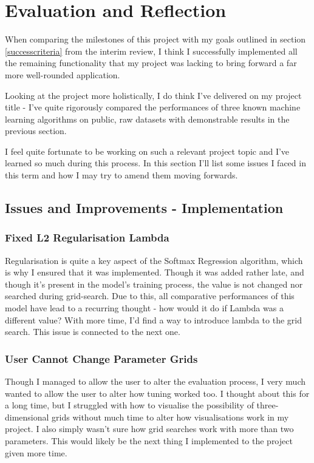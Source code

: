\documentclass[letterpaper,10pt]{article}
\begin{document}
\newpage
\section{Evaluation and Reflection}
When comparing the milestones of this project with my goals outlined in section \ref{successcriteria} from the interim review, I think I successfully implemented all the remaining functionality that my project was lacking to bring forward a far more well-rounded application. \par
Looking at the project more holistically, I do think I've delivered on my project title - I've quite rigorously compared the performances of three known machine learning algorithms on public, raw datasets with demonstrable results in the previous section. \par
I feel quite fortunate to be working on such a relevant project topic and I've learned so much during this process. In this section I'll list some issues I faced in this term and how I may try to amend them moving forwards.\par



\subsection{Issues and Improvements - Implementation}

\subsubsection{Fixed L2 Regularisation Lambda}
Regularisation is quite a key aspect of the Softmax Regression algorithm, which is why I ensured that it was implemented. Though it was added rather late, and though it's present in the model's training process, the value is not changed nor searched during grid-search. Due to this, all comparative performances of this model have lead to a recurring thought - how would it do if Lambda was a different value? With more time, I'd find a way to introduce lambda to the grid search. This issue is connected to the next one. \par

\subsubsection{User Cannot Change Parameter Grids}
Though I managed to allow the user to alter the evaluation process, I very much wanted to allow the user to alter how tuning worked too. I thought about this for a long time, but I struggled with how to visualise the possibility of three-dimensional grids without much time to alter how visualisations work in my project. I also simply wasn't sure how grid searches work with more than two parameters. This would likely be the next thing I implemented to the project given more time. \par
\end{document}
